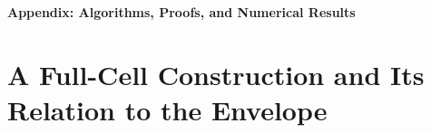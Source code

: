 \setcounter{algorithm}{0}
\setcounter{figure}{0}
\setcounter{equation}{0}
\setcounter{theorem}{0}

\renewcommand{\thetheorem}{S\arabic{theorem}}
\renewcommand{\thelemma}{S\arabic{lemma}}
\renewcommand{\theequation}{S\arabic{equation}}
\renewcommand{\thefigure}{S\arabic{figure}}
\renewcommand{\thetable}{S\arabic{table}}
\renewcommand{\thealgorithm}{S\arabic{algorithm}}


\begin{center}
    \Large \textbf{Appendix: Algorithms, Proofs, and Numerical Results}
\end{center}

\section{A Full-Cell Construction and Its Relation to the Envelope}\label{app:full-cell-envelope}


